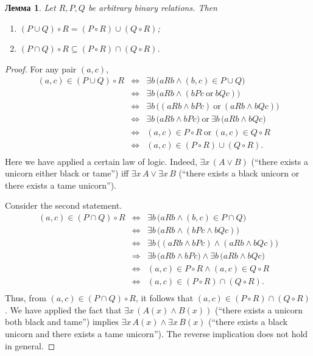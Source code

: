\documentclass[12pt,notitlepage]{article}
\theoremstyle{plain}
\newtheorem{lemma}[thm]{Лемма}
\theoremstyle{definition}
\theoremstyle{plain}
\newcommand{\sbs}{\subseteq}
\newcommand{\1}{\mathbf{1}}
\newcommand{\0}{\mathbf{0}}
\newcommand{\ply}{\Longrightarrow}
\begin{document}
\begin{lemma}\label{ch0:ex11}
	Let $R, P, Q $ be arbitrary binary relations. Then
	\begin{enumerate}
		\item $(P \cup Q) \circ R = (P \circ R) \cup (Q \circ R)$;
		\item $(P \cap Q) \circ R \sbs (P \circ R) \cap (Q \circ R)$.
	\end{enumerate}
\end{lemma}
\begin{proof}
	For any pair $(a,c)$,
	$$
	\begin{array}{rcl}
		(a, c) \in (P \cup Q) \circ R &\iff& \exists b\, \bigl( a R b \wedge (b,c) \in P \cup Q \bigr)\\
		&\iff& \exists b\, \bigl( a R b \wedge ( b P c\ \mbox{or}\ b Q c) \bigr)\\
		&\iff& \exists b\, \bigl( (a R b \wedge  b P c)\ \mbox{or}\ (a R b \wedge b Q c) \bigr)\\
		&\iff& \exists b\, \bigl( a R b \wedge  b P c \bigl)\ \mbox{or}\ \exists b\, \bigl(a R b \wedge b Q c \bigr)\\
		&\iff& (a,c) \in P \circ R\ \mbox{or}\ (a,c) \in Q \circ R\\
		&\iff& (a,c) \in (P \circ R) \cup (Q \circ R).\\
	\end{array}
	$$
	Here we have applied a certain law of logic. Indeed, $\exists x\, (A \vee B)$ (``there exists a  unicorn either black or tame'') iff $\exists x\, A \vee \exists x\, B$ (``there exists a black unicorn or there exists a tame unicorn'').
	
	Consider the second statement.
	$$
	\begin{array}{rcl}
		(a, c) \in (P \cap Q) \circ R &\iff& \exists b\, \bigl( a R b \wedge (b,c) \in P \cap Q \bigr)\\
		&\iff& \exists b\, \bigl( a R b \wedge ( b P c \wedge b Q c) \bigr)\\
		&\iff& \exists b\, \bigl( (a R b \wedge  b P c) \wedge (a R b \wedge b Q c) \bigr)\\
		&\ply& \exists b\, \bigl( a R b \wedge  b P c \bigl) \wedge \exists b\, \bigl(a R b \wedge b Q c \bigr)\\
		&\iff& (a,c) \in P \circ R \wedge (a,c) \in Q \circ R\\
		&\iff& (a,c) \in (P \circ R) \cap (Q \circ R).\\
	\end{array}
	$$
	Thus, from $(a,c) \in (P \cap Q) \circ R$, it follows that $(a,c) \in (P \circ R) \cap (Q \circ R)$. We have applied the fact that $\exists x\, (A(x) \wedge B(x))$ (``there exists a unicorn both black and tame'') implies $\exists x\, A(x) \wedge \exists x\, B(x)$ (``there exists a black unicorn and there exists a tame unicorn''). The reverse implication does not hold in general.
\end{proof}
\end{document}
